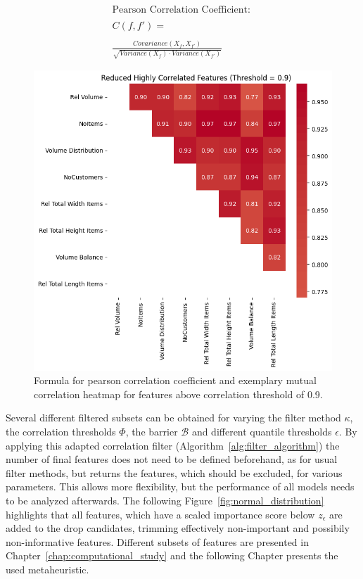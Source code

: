 \begin{figure}[ht]
    \centering
    \begin{minipage}{.48\linewidth}
        \begin{gather*}
            \text{Pearson Correlation Coefficient: } \\\\C(f,f') = \\\\\frac{Covariance(X_f,X_{f'})}{\sqrt{Variance(X_f)\cdot Variance(X_{f'})}}
        \end{gather*}
    \end{minipage}%
    \begin{minipage}{.48\linewidth}
        \includegraphics[width=\linewidth]{pictures/exemplary_small_correlation_matrix.png}
    \end{minipage}
    \caption{Formula for pearson correlation coefficient and exemplary mutual correlation heatmap for features above correlation threshold of 0.9. }
    \label{fig:pearson_correlation_example}
\end{figure}

Several different filtered subsets can be obtained for varying the filter method $\kappa$, the correlation thresholds $\Phi$, the barrier $\mathcal{B}$ and
different quantile thresholds $\epsilon$. By applying this adapted correlation filter (Algorithm~\ref{alg:filter_algorithm}) the number of final
features does not need to be defined beforehand, as for usual filter methods, but returns the features, which should be excluded, for
various parameters. This allows more flexibility, but the performance of all models needs to be analyzed afterwards.
The following Figure~\ref{fig:normal_distribution} highlights that all features, which have a scaled importance score below $z_{\epsilon}$ are added to the drop candidates, trimming
effectively non-important and possibily non-informative features. Different subsets of features are presented in Chapter~\ref{chap:computational_study} and the following Chapter
presents the used metaheuristic.

